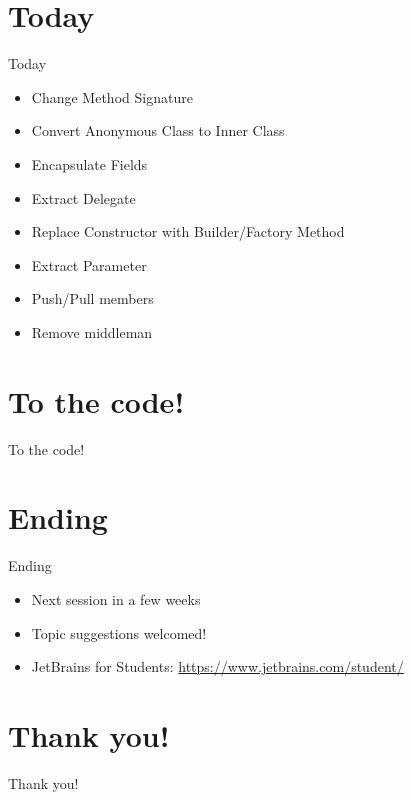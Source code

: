 \documentclass{beamer}
\begin{document}
\section{Today}
\begin{frame}{Today}
\begin{itemize}
\item Change Method Signature
\item Convert Anonymous Class to Inner Class
\item Encapsulate Fields
\item Extract Delegate
\item Replace Constructor with Builder/Factory Method
\item Extract Parameter
\item Push/Pull members
\item Remove middleman
\end{itemize}
\end{frame}

\section{To the code!}

\begin{frame}{To the code!}

\end{frame}

\section{Ending}

\begin{frame}{Ending}

\begin{itemize}
    \item Next session in a few weeks
    \item Topic suggestions welcomed!
    \item JetBrains for Students: \url{https://www.jetbrains.com/student/}
\end{itemize}
\end{frame}

\section{Thank you!}
\begin{frame}{Thank you!}

\end{frame}
\end{document}
